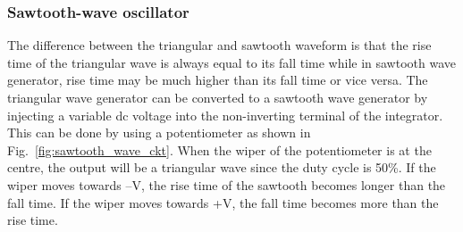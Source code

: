\subsubsection{Sawtooth-wave oscillator}
The difference between the triangular and sawtooth waveform is that the rise time of
the triangular wave is always equal to its fall time while in sawtooth wave generator, rise time may be much higher than its fall time or vice versa. The triangular wave generator can be converted to a sawtooth wave generator by injecting a variable dc voltage into the non-inverting terminal of the integrator. This can be done by using a potentiometer as shown in Fig.~\ref{fig:sawtooth_wave_ckt}. When the wiper of the potentiometer is at the centre, the output will be a triangular wave since the duty cycle is 50\%. If the wiper moves towards –V, the rise time of the sawtooth becomes longer than the fall time. If the wiper moves towards +V, the fall time becomes more than the rise time.

%

